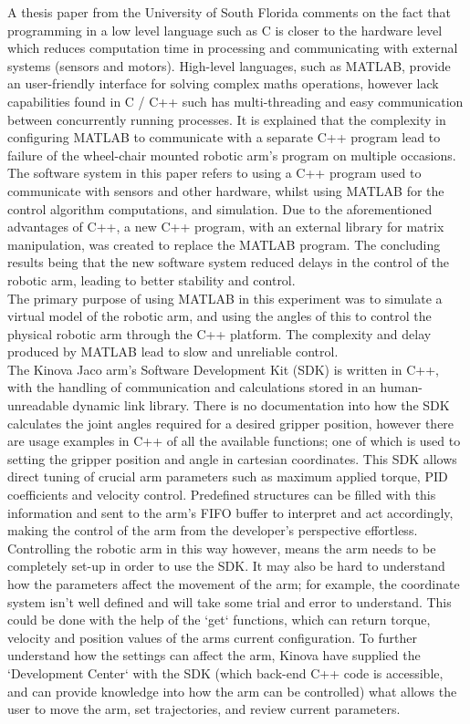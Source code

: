 \documentclass[12pt,openany,a4paper]{book}
\begin{document}
A thesis paper from the University of South Florida comments on the fact that programming in a low level language such as C is closer to the hardware level which reduces computation time in processing and communicating with external systems (sensors and motors). High-level languages, such as MATLAB, provide an user-friendly interface for solving complex maths operations, however lack capabilities found in C / C++ such has multi-threading and easy communication between concurrently running processes. It is explained that the complexity in configuring MATLAB to communicate with a separate C++ program lead to failure of the wheel-chair mounted robotic arm's program on multiple occasions. The software system in this paper refers to using a C++ program used to communicate with sensors and other hardware, whilst using MATLAB for the control algorithm computations, and simulation. Due to the aforementioned advantages of C++, a new C++ program, with an external library for matrix manipulation, was created to replace the MATLAB program. The concluding results being that the new software system reduced delays in the control of the robotic arm, leading to better stability and control.\\
The primary purpose of using MATLAB in this experiment was to simulate a virtual model of the robotic arm, and using the angles of this to control the physical robotic arm through the C++ platform. The complexity and delay produced by MATLAB lead to slow and unreliable control.\\


The Kinova Jaco arm's Software Development Kit (SDK) is written in C++, with the handling of communication and calculations stored in an human-unreadable dynamic link library. There is no documentation into how the SDK calculates the joint angles required for a desired gripper position, however there are usage examples in C++ of all the available functions; one of which is used to setting the gripper position and angle in cartesian coordinates. This SDK allows direct tuning of crucial arm parameters such as maximum applied torque, PID coefficients and velocity control. Predefined structures can be filled with this information and sent to the arm's FIFO buffer to interpret and act accordingly, making the control of the arm from the developer's perspective effortless.\\
Controlling the robotic arm in this way however, means the arm needs to be completely set-up in order to use the SDK. It may also be hard to understand how the parameters affect the movement of the arm; for example, the coordinate system isn't well defined and will take some trial and error to understand. This could be done with the help of the `get` functions, which can return torque, velocity and position values of the arms current configuration. To further understand how the settings can affect the arm, Kinova have supplied the `Development Center` with the SDK (which back-end C++ code is accessible, and can provide knowledge into how the arm can be controlled) what allows the user to move the arm, set trajectories, and review current parameters.\\
\end{document}
